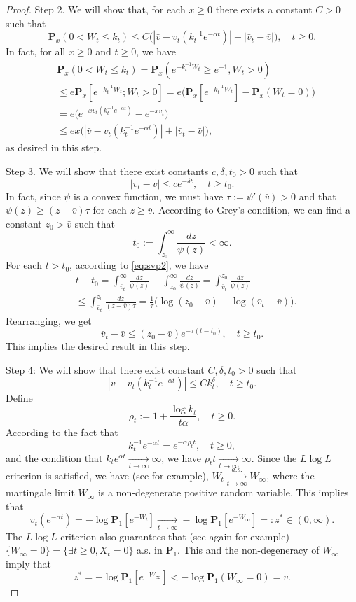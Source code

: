 \documentclass[12pt,a4paper]{amsart}
\theoremstyle{plain}
\theoremstyle{definition}
\numberwithin{equation}{section}
\begin{document}
\begin{proof}
    Step 2. We will show that, for each $x \geq 0$ there exists a constant $C>0$ such that
\[
    \mathbf P_{x}(0< W_t\leq k_t)
    \leq C\big(|\bar v- v_t(k_t^{-1}e^{-\alpha t})|+|\bar v_t - \bar v|\big),
    \quad t\geq 0.
\]
    In fact, for all $x\geq 0$ and $t\geq 0$, we have
\begin{align}
    &\mathbf P_{x}(0<W_t \leq k_t)
    = \mathbf P_{x}( e^{-k_t^{-1}W_t}\geq e^{-1},W_t > 0)
    \\&\leq e \mathbf P_{x}[e^{-k_t^{-1} W_t};W_t > 0]
    =  e\big(\mathbf P_x[e^{-k_t^{-1} W_t}]-\mathbf P_x(W_t = 0)\big)
    \\ &= e\big(e^{-xv_t(k_t^{-1} e^{-\alpha t})}-e^{-x\bar v_t}\big)
    \\&\leq ex \big(|\bar v-v_t(k_t^{-1} e^{-\alpha t})|+ |\bar v_t- \bar v|\big),
\end{align}
    as desired in this step.

    Step 3. We will show that there exist constants $c, \delta, t_0 > 0$ such that
\[
    |\bar v_t-\bar v|
    \leq ce^{-\delta t},
    \quad t\geq t_0.
\]
        In fact, since $\psi$ is a convex function, we must have $\tau:=\psi'(\bar v)>0$ and that  $\psi(z) \geq (z-\bar v)\tau$ for each $z\geq \bar v$.
    According to Grey's condition, we can find a constant $z_0 >\bar v $ such that
\[
    t_0
    := \int^\infty_{z_0} \frac{dz}{\psi(z)} < \infty.
\]
    For each $t > t_0$, according to \eqref{eq:svp2}, we have
\begin{align}
    &t-t_0 = \int^\infty_{\bar v_t} \frac{dz}{\psi(z)} - \int_{z_0}^\infty \frac{dz}{\psi(z)}
    =\int_{\bar v_t}^{z_0} \frac{dz}{\psi(z)}
    \\ &\leq \int_{\bar v_t}^{z_0} \frac{dz}{(z-\bar v)\tau}
    = \frac{1}{\tau} \big(\log (z_0-\bar v) - \log(\bar v_t-\bar v)\big).
\end{align}
    Rearranging, we get
\[
    \bar v_t - \bar v \leq (z_0 - \bar v)e^{-\tau(t-t_0)},
    \quad t\geq t_0.
\]
    This implies the desired result in this step.

    Step 4: We will show that there exist constant $C, \delta,t_0>0$ such that
\[
    |\bar v - v_t(k_t^{-1} e^{-\alpha t})|\leq Ck_t^\delta, \quad t\geq t_0.
\]
    Define
\[
    \rho_t := 1+ \frac{\log k_t}{t\alpha}, \quad t\geq 0.
\]
    According to the fact that
\[
    k_t^{-1}e^{-\alpha t} = e^{-\alpha \rho_t t}, \quad t\geq 0,
\]
    and the condition that $k_t e^{\alpha t} \xrightarrow[t\to \infty]{} \infty$, we have $\rho_t t \xrightarrow[t\to \infty]{} \infty $.
    Since the $L\log L$ criterion is satisfied, we have (see \cite{LiuRenSong2009Llog} for example), $W_t \xrightarrow[t\to \infty]{a.s.} W_\infty$, where the martingale limit $W_\infty$ is a non-degenerate positive random variable. This implies that
\[
    v_t(e^{-\alpha t}) = -\log \mathbf P_1[e^{-W_t}]\xrightarrow[t\to \infty]{} - \log \mathbf P_{1}[e^{-W_\infty}] =: z^* \in (0,\infty).
\]
    The $L \log L$ criterion also guarantees that (see again \cite{LiuRenSong2009Llog} for example) $\{W_\infty = 0\} = \{\exists t \geq 0, X_t= 0\}$  a.s. in $\mathbf P_1$. This and the non-degeneracy of $W_\infty$ imply that
\[
    z^*=-\log \mathbf P_1[e^{-W_\infty}] < -\log \mathbf P_1(W_\infty = 0) = \bar v.
\]


\end{proof}
\end{document}

